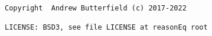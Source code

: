 \begin{verbatim}
Copyright  Andrew Butterfield (c) 2017-2022
        
LICENSE: BSD3, see file LICENSE at reasonEq root
\end{verbatim}